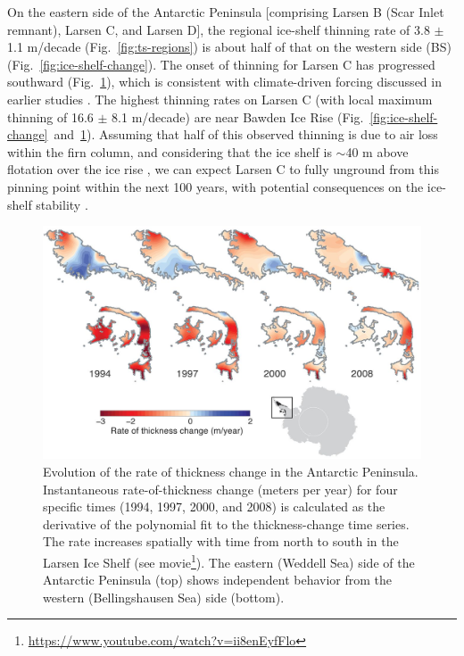 On the eastern side of the Antarctic Peninsula
[comprising Larsen B (Scar Inlet remnant), Larsen 
C, and Larsen D], the regional ice-shelf thinning
rate of 3.8 $\pm$ 1.1 m/decade (Fig.~\ref{fig:ts-regions}) is about half of
that on the western side (BS) (Fig.~\ref{fig:ice-shelf-change}). The onset of
thinning for Larsen C has progressed southward
(Fig.~\ref{c3f4}), which is consistent with climate-driven
forcing discussed in earlier studies \parencite{Fricker2012, Cook2010}. The
highest thinning rates on Larsen C (with local
maximum thinning of 16.6 $\pm$ 8.1 m/decade) are
near Bawden Ice Rise (Fig.~\ref{fig:ice-shelf-change}~and~\ref{c3f4}). Assuming
that half of this observed thinning is due to air
loss within the firn column, and considering
that the ice shelf is $\sim$40 m above flotation over
the ice rise \parencite{Holland2015}, we can expect Larsen C to fully
unground from this pinning point within the
next 100 years, with potential consequences on
the ice-shelf stability \parencite{Borstad2013}.


\begin{figure}[!h]
  \includegraphics[width=\textwidth]{img/Fig4_antpen_pannels_review_final.jpg}
  \caption[Evolution of the rate of thickness change]{
  \ssp \footnotesize
  Evolution of the rate of thickness
  change in the Antarctic Peninsula. Instantaneous
  rate-of-thickness change (meters per year) for
  four specific times (1994, 1997, 2000, and 2008)
  is calculated as the derivative of the polynomial fit
  to the thickness-change time series. The rate
  increases spatially with time from north to south
  in the Larsen Ice Shelf (see movie\footnote{\url{https://www.youtube.com/watch?v=ii8enEyfFlo}}). The eastern
  (Weddell Sea) side of the Antarctic Peninsula (top)
  shows independent behavior from the western
  (Bellingshausen Sea) side (bottom).
  }
  \label{c3f4}
\end{figure}


